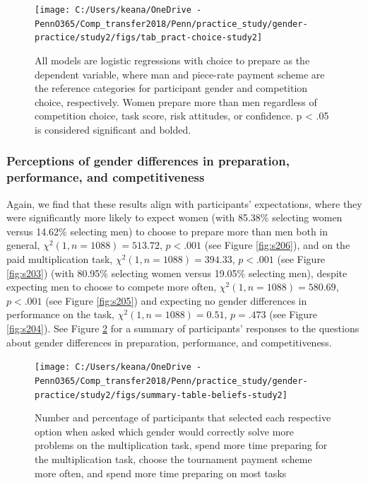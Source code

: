 \documentclass[a4paper, nobind]{templates/ociamthesis}
\begin{document}
\begin{figure}

{\centering \texttt{[image: C:/Users/keana/OneDrive - PennO365/Comp\_transfer2018/Penn/practice\_study/gender-practice/study2/figs/tab\_pract-choice-study2]} 

}

\caption{All models are logistic regressions with choice to prepare as the dependent variable, where man and piece-rate payment scheme are the reference categories for participant gender and competition choice, respectively. Women prepare more than men regardless of competition choice, task score, risk attitudes, or confidence. p < .05 is considered significant and bolded.}\label{fig:tab-pract-choice-study2}
\end{figure}

\hypertarget{perceptions-of-gender-differences-in-preparation-performance-and-competitiveness-2}{%
\subsubsection{Perceptions of gender differences in preparation, performance, and competitiveness}\label{perceptions-of-gender-differences-in-preparation-performance-and-competitiveness-2}}

Again, we find that these results align with participants' expectations, where they were significantly more likely to expect women (with 85.38\% selecting women versus 14.62\% selecting men) to choose to prepare more than men both in general, \(\chi^2(1, n = 1088) = 513.72\), \(p < .001\) (see Figure \ref{fig:s206}), and on the paid multiplication task, \(\chi^2(1, n = 1088) = 394.33\), \(p < .001\) (see Figure \ref{fig:s203}) (with 80.95\% selecting women versus 19.05\% selecting men), despite expecting men to choose to compete more often, \(\chi^2(1, n = 1088) = 580.69\), \(p < .001\) (see Figure \ref{fig:s205}) and expecting no gender differences in performance on the task, \(\chi^2(1, n = 1088) = 0.51\), \(p = .473\) (see Figure \ref{fig:s204}). See Figure \ref{fig:summary-table-beliefs-study2} for a summary of participants' responses to the questions about gender differences in preparation, performance, and competitiveness.

\begin{figure}

{\centering \texttt{[image: C:/Users/keana/OneDrive - PennO365/Comp\_transfer2018/Penn/practice\_study/gender-practice/study2/figs/summary-table-beliefs-study2]} 

}

\caption{Number and percentage of participants that selected each respective option when asked which gender would correctly solve more problems on the multiplication task, spend more time preparing for the multiplication task, choose the tournament payment scheme more often, and spend more time preparing on most tasks}\label{fig:summary-table-beliefs-study2}
\end{figure}
\end{document}
